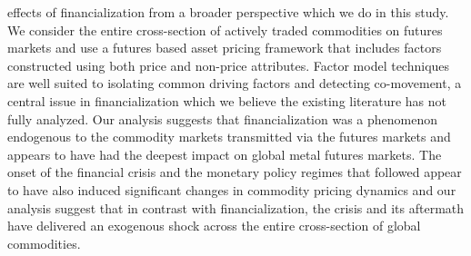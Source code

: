 \documentclass[12pt,]{article}
\begin{document}
effects of financialization from a broader perspective which we do in
this study. We consider the entire cross-section of actively traded
commodities on futures markets and use a futures based asset pricing
framework that includes factors constructed using both price and
non-price attributes. Factor model techniques are well suited to
isolating common driving factors and detecting co-movement, a central
issue in financialization which we believe the existing literature has
not fully analyzed. Our analysis suggests that financialization was a
phenomenon endogenous to the commodity markets transmitted via the
futures markets and appears to have had the deepest impact on global
metal futures markets. The onset of the financial crisis and the
monetary policy regimes that followed appear to have also induced
significant changes in commodity pricing dynamics and our analysis
suggest that in contrast with financialization, the crisis and its
aftermath have delivered an exogenous shock across the entire
cross-section of global commodities.

\newpage
\begingroup\fontsize{10}{12}\selectfont
\end{document}
